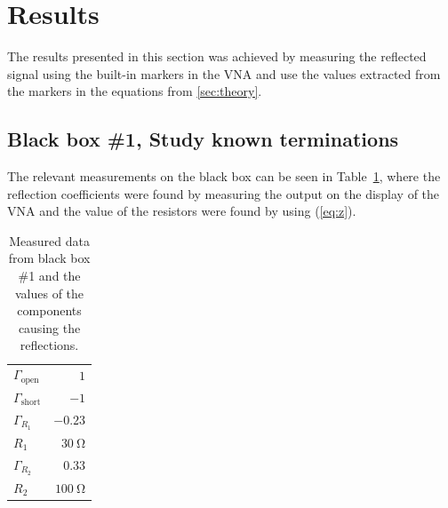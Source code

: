 \documentclass[12pt,a4paper]{article}
\begin{document}
\section{Results}
The results presented in this section was achieved by measuring the reflected signal using the built-in markers in the VNA and use the values extracted from the markers in the equations from \ref{sec:theory}.
\subsection{Black box \#1, Study known terminations}
The relevant measurements on the black box can be seen in Table~\ref{tab:box1}, where the reflection coefficients were found by measuring the output on the display of the VNA and the value of the resistors were found by using (\ref{eq:z}).
\begin{table}[ht]
  \centering
  \caption{Measured data from black box \#1 and the values of the components causing the reflections.}
  \begin{tabular}{|l|r|}\hline
    $\Gamma_{\text{open}}$ & $1$ \\
    $\Gamma_{\text{short}}$ & $-1$ \\
    $\Gamma_{R_{1}}$ & $-0.23$ \\
    $R_{1}$ & $\SI{30}{\ohm}$ \\
    $\Gamma_{R_{2}}$ & $0.33$ \\
    $R_{2}$ & $\SI{100}{\ohm}$ \\ \hline
  \end{tabular}
  \label{tab:box1}
\end{table}
\end{document}
